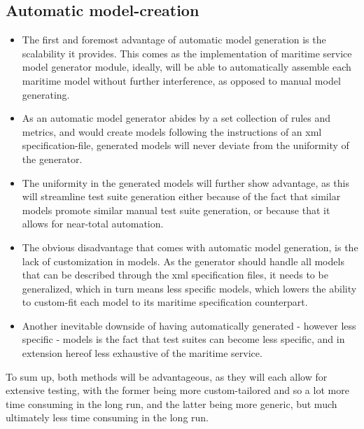 \subsection{Automatic model-creation}
\begin{itemize}
  \item The first and foremost advantage of automatic model generation is the scalability it provides. This comes as the implementation of  maritime service model generator module, ideally, will be able to automatically assemble each maritime model without further interference, as opposed to manual model generating.
  \item As an automatic model generator abides by a set collection of rules and metrics, and would create models following the instructions of an xml specification-file, generated models will never deviate from the uniformity of the generator.
  \item The uniformity in the generated models will further show advantage, as this will streamline test suite generation either because of the fact that similar models promote similar manual test suite generation, or because that it allows for near-total automation.
\end{itemize}
\begin{itemize}
  \item The obvious disadvantage that comes with automatic model generation, is the lack of customization in models. As the generator should handle all models that can be described through the xml specification files, it needs to be generalized, which in turn means less specific models, which lowers the ability to custom-fit each model to its maritime specification counterpart.
  \item Another inevitable downside of having automatically generated - however less specific - models is the fact that test suites can become less specific, and in extension hereof less exhaustive of the maritime service.
\end{itemize}
\indent
To sum up, both methods will be advantageous, as they will each allow for extensive testing, with the former being more custom-tailored and so a lot more time consuming in the long run, and the latter being more generic, but much ultimately less time consuming in the long run.